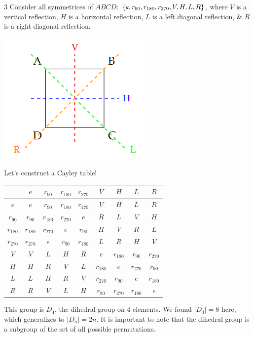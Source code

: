 \begin{example}3
    Consider all symmetrices of $ABCD$: $\left\{e, r_{90}, r_{180}, r_{270}, V, H, L, R\right\}$, 
    where $V$ is a vertical reflection, $H$ is a horizontal reflection, 
    $L$ is a left diagonal reflection, \& $R$ is a right diagonal reflection. 
    \begin{center}
        \includegraphics[scale=1]{figures/square_symmetries.png}
    \end{center}
    Let's construct a Cayley table! 
    \begin{center}
        \begin{tabular}{c|cccc|cccc}
                      & $e$       & $r_{90}$  & $r_{180}$ & $r_{270}$ & $V$       & $H$       & $L$       & $R$       \\ \hline 
            $e$       & $e$       & $r_{90}$  & $r_{180}$ & $r_{270}$ & $V$       & $H$       & $L$       & $R$       \\
            $r_{90}$  & $r_{90}$  & $r_{180}$ & $r_{270}$ & $e$       & $R$       & $L$       & $V$       & $H$       \\
            $r_{180}$ & $r_{180}$ & $r_{270}$ & $e$       & $r_{90}$  & $H$       & $V$       & $R$       & $L$       \\
            $r_{270}$ & $r_{270}$ & $e$       & $r_{90}$  & $r_{180}$ & $L$       & $R$       & $H$       & $V$       \\ \hline 
            $V$       & $V$       & $L$       & $H$       & $R$       & $e$       & $r_{180}$ & $r_{90}$  & $r_{270}$ \\
            $H$       & $H$       & $R$       & $V$       & $L$       & $r_{180}$ & $e$       & $r_{270}$ & $r_{90}$  \\
            $L$       & $L$       & $H$       & $R$       & $V$       & $r_{270}$ & $r_{90}$  & $e$       & $r_{180}$ \\
            $R$       & $R$       & $V$       & $L$       & $H$       & $r_{90}$  & $r_{270}$ & $r_{180}$ & $e$       \\
        \end{tabular}
    \end{center}
    This group is $D_4$, the dihedral group on 4 elements. We found $|D_4| = 8$ here, which generalizes to $|D_n| = 2n$. 
    It is important to note that the dihedral group is a subgroup of the set of all possible permutations. 
\end{example}


